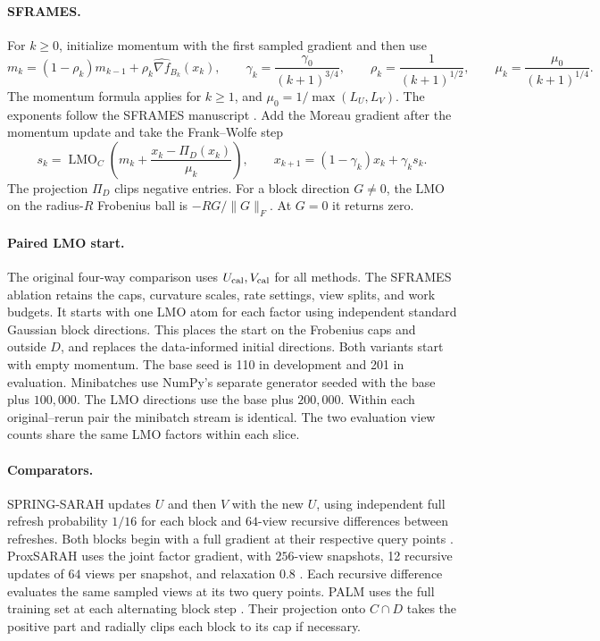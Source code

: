 \documentclass[11pt]{article}
\begin{document}
\paragraph{SFRAMES.}
For \(k\ge0\), initialize momentum with the first sampled gradient and then use
\[
  m_k=(1-\rho_k)m_{k-1}+\rho_k\widehat{\nabla f}_{B_k}(x_k),
  \qquad
  \gamma_k=\frac{\gamma_0}{(k+1)^{3/4}},\qquad
  \rho_k=\frac{1}{(k+1)^{1/2}},\qquad
  \mu_k=\frac{\mu_0}{(k+1)^{1/4}} .
\]
The momentum formula applies for \(k\ge1\), and \(\mu_0=1/\max(L_U,L_V)\). The exponents follow the SFRAMES manuscript \cite{sframes}. Add the Moreau gradient after the momentum update and take the Frank--Wolfe step
\[
  s_k=\operatorname{LMO}_C\left(m_k+
             \frac{x_k-\Pi_D(x_k)}{\mu_k}\right),
  \qquad
  x_{k+1}=(1-\gamma_k)x_k+\gamma_k s_k .
\]
The projection \(\Pi_D\) clips negative entries. For a block direction \(G\ne0\), the LMO on the radius-\(R\) Frobenius ball is \(-RG/\|G\|_F\). At \(G=0\) it returns zero.

\paragraph{Paired LMO start.}
The original four-way comparison uses \(U_{\rm cal},V_{\rm cal}\) for all methods. The SFRAMES ablation retains the caps, curvature scales, rate settings, view splits, and work budgets. It starts with one LMO atom for each factor using independent standard Gaussian block directions. This places the start on the Frobenius caps and outside \(D\), and replaces the data-informed initial directions. Both variants start with empty momentum. The base seed is 110 in development and 201 in evaluation. Minibatches use NumPy's separate generator seeded with the base plus \(100{,}000\). The LMO directions use the base plus \(200{,}000\). Within each original--rerun pair the minibatch stream is identical. The two evaluation view counts share the same LMO factors within each slice.

\paragraph{Comparators.}
SPRING-SARAH updates \(U\) and then \(V\) with the new \(U\), using independent full refresh probability \(1/16\) for each block and \(64\)-view recursive differences between refreshes. Both blocks begin with a full gradient at their respective query points \cite{spring}. ProxSARAH uses the joint factor gradient, with \(256\)-view snapshots, 12 recursive updates of \(64\) views per snapshot, and relaxation \(0.8\) \cite{proxsarah}. Each recursive difference evaluates the same sampled views at its two query points. PALM uses the full training set at each alternating block step \cite{palm}. Their projection onto \(C\cap D\) takes the positive part and radially clips each block to its cap if necessary.
\end{document}
